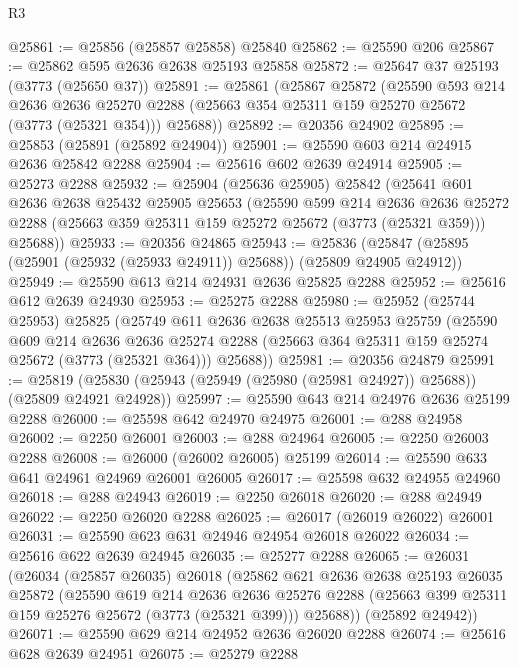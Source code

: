 \begin{lexlean}{R3}
\begin{coremodule}
@25861 := @25856 (@25857 @25858) @25840
@25862 := @25590 @206
@25867 := @25862 @595 @2636 @2638 @25193 @25858
@25872 := @25647 @37 @25193 (@3773 (@25650 @37))
@25891 := @25861
    (@25867
      @25872
      (@25590
        @593
        @214
        @2636
        @2636
        @25270
        @2288
        (@25663 @354 @25311 @159 @25270 @25672 (@3773 (@25321 @354)))
        @25688))
@25892 := @20356 @24902
@25895 := @25853 (@25891 (@25892 @24904))
@25901 := @25590 @603 @214 @24915 @2636 @25842 @2288
@25904 := @25616 @602 @2639 @24914
@25905 := @25273 @2288
@25932 := @25904
    (@25636 @25905)
    @25842
    (@25641
      @601
      @2636
      @2638
      @25432
      @25905
      @25653
      (@25590
        @599
        @214
        @2636
        @2636
        @25272
        @2288
        (@25663 @359 @25311 @159 @25272 @25672 (@3773 (@25321 @359)))
        @25688))
@25933 := @20356 @24865
@25943 := @25836 (@25847 (@25895 (@25901 (@25932 (@25933 @24911)) @25688)) (@25809 @24905 @24912))
@25949 := @25590 @613 @214 @24931 @2636 @25825 @2288
@25952 := @25616 @612 @2639 @24930
@25953 := @25275 @2288
@25980 := @25952
    (@25744 @25953)
    @25825
    (@25749
      @611
      @2636
      @2638
      @25513
      @25953
      @25759
      (@25590
        @609
        @214
        @2636
        @2636
        @25274
        @2288
        (@25663 @364 @25311 @159 @25274 @25672 (@3773 (@25321 @364)))
        @25688))
@25981 := @20356 @24879
@25991 := @25819 (@25830 (@25943 (@25949 (@25980 (@25981 @24927)) @25688)) (@25809 @24921 @24928))
@25997 := @25590 @643 @214 @24976 @2636 @25199 @2288
@26000 := @25598 @642 @24970 @24975
@26001 := @288 @24958
@26002 := @2250 @26001
@26003 := @288 @24964
@26005 := @2250 @26003 @2288
@26008 := @26000 (@26002 @26005) @25199
@26014 := @25590 @633 @641 @24961 @24969 @26001 @26005
@26017 := @25598 @632 @24955 @24960
@26018 := @288 @24943
@26019 := @2250 @26018
@26020 := @288 @24949
@26022 := @2250 @26020 @2288
@26025 := @26017 (@26019 @26022) @26001
@26031 := @25590 @623 @631 @24946 @24954 @26018 @26022
@26034 := @25616 @622 @2639 @24945
@26035 := @25277 @2288
@26065 := @26031
    (@26034
      (@25857 @26035)
      @26018
      (@25862
        @621
        @2636
        @2638
        @25193
        @26035
        @25872
        (@25590
          @619
          @214
          @2636
          @2636
          @25276
          @2288
          (@25663 @399 @25311 @159 @25276 @25672 (@3773 (@25321 @399)))
          @25688))
      (@25892 @24942))
@26071 := @25590 @629 @214 @24952 @2636 @26020 @2288
@26074 := @25616 @628 @2639 @24951
@26075 := @25279 @2288

\end{coremodule}
\end{lexlean}
